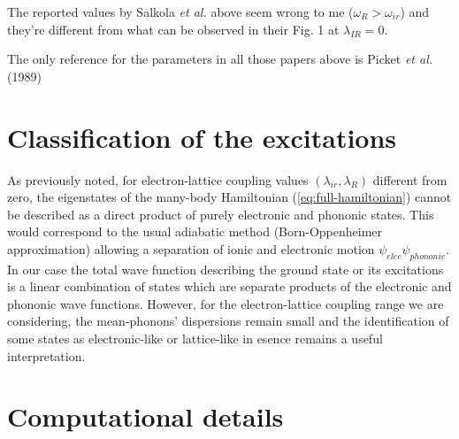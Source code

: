 The reported values by Salkola \textit{et al.}\cite{Salkola1994} \cite{Salkola1995} above seem wrong to me ($\omega_R > \omega_{ir}$) and they're different from what can be observed in their Fig. 1 at $\lambda_{IR}=0$.

The only reference for the parameters in all those papers above is Picket \textit{et al.} (1989)

\section{Classification of the excitations}
\label{sec:classification}


As previously noted, for electron-lattice coupling values $(\lambda_{ir},\lambda_R)$ different from zero, the eigenstates of the many-body Hamiltonian (\ref{eq:full-hamiltonian}) cannot be described as a direct product of purely electronic and phononic states. 
This would correspond to the usual adiabatic method (Born-Oppenheimer approximation) allowing a separation of ionic and electronic motion $\psi_{elec}\psi_{phononic}$. 
In our case the total wave function describing the ground state or its excitations is a linear combination of states which are separate products of the electronic and phononic wave functions. 
However, for the electron-lattice coupling range we are considering, the mean-phonons' dispersions remain small and the identification of some states as electronic-like or lattice-like in esence remains a useful interpretation.


\section{Computational details}
\label{sec:comp_details}

